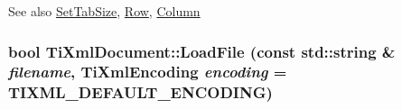 \begin{DoxySeeAlso}{See also}
\hyperlink{class_ti_xml_document_a51dac56316f89b35bdb7d0d433ba988e}{SetTabSize}, \hyperlink{class_ti_xml_base_a024bceb070188df92c2a8d8852dd0853}{Row}, \hyperlink{class_ti_xml_base_ab54bfb9b70fe6dd276e7b279cab7f003}{Column} 
\end{DoxySeeAlso}
\hypertarget{class_ti_xml_document_a18ae6ed34fed7991ebc220862dfac884}{
\subsubsection[{LoadFile}]{\setlength{\rightskip}{0pt plus 5cm}bool TiXmlDocument::LoadFile (const std::string \& {\em filename}, \/  TiXmlEncoding {\em encoding} = {\ttfamily TIXML\_\-DEFAULT\_\-ENCODING})}}
\label{class_ti_xml_document_a18ae6ed34fed7991ebc220862dfac884}

